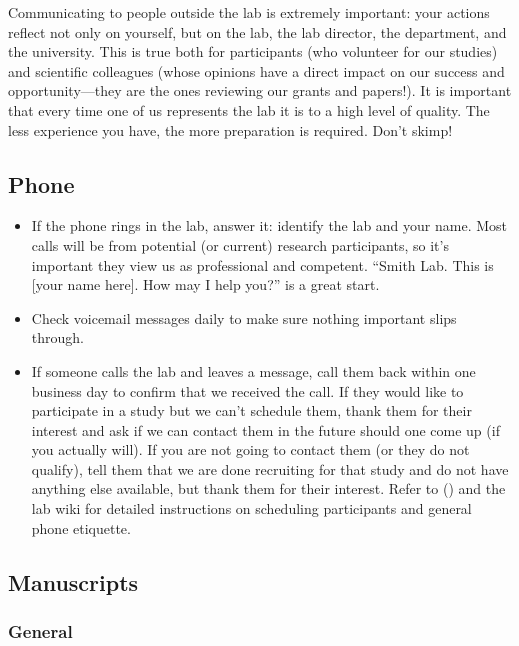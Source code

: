 \documentclass[letterpaper,12pt,oneside]{memoir}
\begin{document}
Communicating to people outside the lab is extremely important: your actions reflect not only on yourself, but on the lab, the lab director, the department, and the university. This is true both for participants (who volunteer for our studies) and scientific colleagues (whose opinions have a direct impact on our success and opportunity---they are the ones reviewing our grants and papers!). It is important that every time one of us represents the lab it is to a high level of quality. The less experience you have, the more preparation is required. Don't skimp!

\subsection{Phone}

\begin{itemize}
\item If the phone rings in the lab, answer it: identify the lab and your name. Most calls will be from potential (or current) research participants, so it's important they view us as professional and competent. ``Smith Lab. This is [your name here]. How may I help you?'' is a great start. 

\item Check voicemail messages daily to make sure nothing important slips through.

\item If someone calls the lab and leaves a message, call them back within one business day to confirm that we received the call. If they would like to participate in a study but we can't schedule them, thank them for their interest and ask if we can contact them in the future should one come up (if you actually will). If you are not going to contact them (or they do not qualify), tell them that we are done recruiting for that study and do not have anything else available, but thank them for their interest. Refer to  () and the lab wiki for detailed instructions on scheduling participants and general phone etiquette.

\end{itemize}



\subsection{Manuscripts}

\subsubsection{General}
\end{document}
